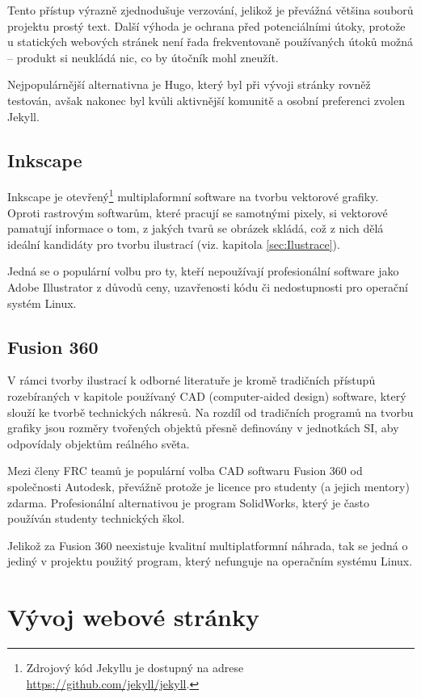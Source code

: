 \documentclass[a4paper, 12pt]{article}
\begin{document}
  Tento přístup výrazně zjednodušuje verzování, jelikož je převážná většina souborů projektu prostý text. Další výhoda je ochrana před potenciálními útoky, protože u statických webových stránek není řada frekventovaně používaných útoků možná -- produkt si neukládá nic, co by útočník mohl zneužít.

  Nejpopulárnější alternativna je Hugo, který byl při vývoji stránky rovněž testován, avšak nakonec byl kvůli aktivnější komunitě a osobní preferenci zvolen Jekyll.


  \subsection{Inkscape} \label{sec:Inkscape}
  Inkscape je otevřený\footnote{Zdrojový kód Jekyllu je dostupný na adrese \url{https://github.com/jekyll/jekyll}.} multiplaformní software na tvorbu vektorové grafiky. Oproti rastrovým softwarům, které pracují se samotnými pixely, si vektorové pamatují informace o tom, z jakých tvarů se obrázek skládá, což z nich dělá ideální kandidáty pro tvorbu ilustrací (viz. kapitola \ref{sec:Ilustrace}).

  Jedná se o populární volbu pro ty, kteří nepoužívají profesionální software jako Adobe Illustrator z důvodů ceny, uzavřenosti kódu či nedostupnosti pro operační systém Linux.


  \subsection{Fusion 360} \label{sec:Fusion 360}
  V rámci tvorby ilustrací k odborné literatuře je kromě tradičních přístupů rozebíraných v kapitole používaný CAD (computer-aided design) software, který slouží ke tvorbě technických nákresů. Na rozdíl od tradičních programů na tvorbu grafiky jsou rozměry tvořených objektů přesně definovány v jednotkách SI, aby odpovídaly objektům reálného světa.

  Mezi členy FRC teamů je populární volba CAD softwaru Fusion 360 od společnosti Autodesk, převážně protože je licence pro studenty (a jejich mentory) zdarma. Profesionální alternativou je program SolidWorks, který je často používán studenty technických škol.

  Jelikož za Fusion 360 neexistuje kvalitní multiplatformní náhrada, tak se jedná o jediný v projektu použitý program, který nefunguje na operačním systému Linux.

  \section{Vývoj webové stránky}
\end{document}
